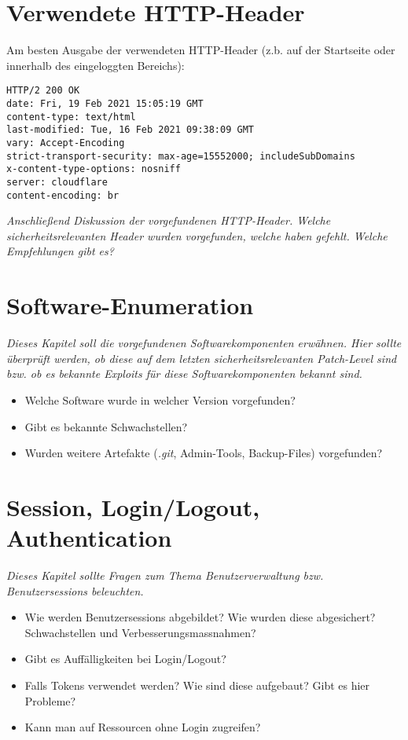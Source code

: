 \section{Verwendete HTTP-Header}

Am besten Ausgabe der verwendeten HTTP-Header (z.b. auf der Startseite oder innerhalb des eingeloggten Bereichs):

\begin{verbatim}
HTTP/2 200 OK
date: Fri, 19 Feb 2021 15:05:19 GMT
content-type: text/html
last-modified: Tue, 16 Feb 2021 09:38:09 GMT
vary: Accept-Encoding
strict-transport-security: max-age=15552000; includeSubDomains
x-content-type-options: nosniff
server: cloudflare
content-encoding: br
\end{verbatim}

\textit{Anschließend Diskussion der vorgefundenen HTTP-Header. Welche sicherheitsrelevanten Header wurden vorgefunden, welche haben gefehlt. Welche Empfehlungen gibt es?}

\section{Software-Enumeration}

\textit{Dieses Kapitel soll die vorgefundenen Softwarekomponenten erwähnen. Hier sollte überprüft werden, ob diese auf dem letzten sicherheitsrelevanten Patch-Level sind bzw. ob es bekannte Exploits für diese Softwarekomponenten bekannt sind.}

\begin{itemize}
	\item Welche Software wurde in welcher Version vorgefunden?
	\item Gibt es bekannte Schwachstellen?
	\item Wurden weitere Artefakte (\textit{.git}, Admin-Tools, Backup-Files) vorgefunden?
\end{itemize}

\section{Session, Login/Logout, Authentication}

\textit{Dieses Kapitel sollte Fragen zum Thema Benutzerverwaltung bzw. Benutzersessions beleuchten.}

\begin{itemize}
				\item Wie werden Benutzersessions abgebildet? Wie wurden diese abgesichert? Schwachstellen und Verbesserungsmassnahmen?
				\item Gibt es Auffälligkeiten bei Login/Logout?
				\item Falls Tokens verwendet werden? Wie sind diese aufgebaut? Gibt es hier Probleme?
				\item Kann man auf Ressourcen ohne Login zugreifen?
\end{itemize}

